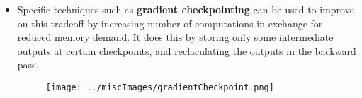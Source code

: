 \documentclass{article}
\newcommand{\tbf}[1]{\textbf{#1}}
\begin{document}
\begin{itemize}
\begin{itemize}
        \item Specific techniques such as \tbf{gradient checkpointing} can be used to improve on this tradeoff by increasing number of computations in exchange for reduced memory demand. It does this by storing only some intermediate outputs at certain checkpoints, and reclaculating the outputs in the backward pass. 
        \begin{figure}[H]
            \centering
            \texttt{[image: ../miscImages/gradientCheckpoint.png]} 
            \label{fig:example}
        \end{figure}
    \end{itemize}
\end{itemize}
\end{document}
